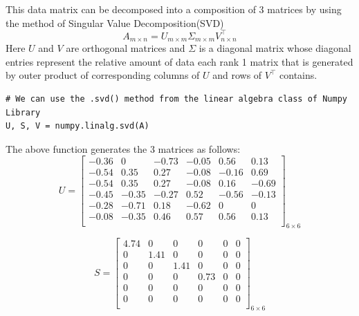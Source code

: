 \documentclass{article}
\begin{document}
This data matrix can be decomposed into a composition of 3 matrices by using the method of Singular Value Decomposition(SVD)
$$ A_{m \times n} = U_{m \times m} \Sigma_{m \times m} V^{\top}_{n \times n} $$
Here $U$ and $V$ are orthogonal matrices and $\Sigma$ is a diagonal matrix whose diagonal entries represent the relative amount of data each rank 1 matrix that is generated by outer product of corresponding columns of $U$ and rows of $V^{\top}$ contains. \\

\begin{verbatim}
# We can use the .svd() method from the linear algebra class of Numpy Library
U, S, V = numpy.linalg.svd(A)
\end{verbatim}

The above function generates the 3 matrices as follows:
\begin{equation*}
    U = \begin{bmatrix}
        -0.36 & 0 & -0.73 & -0.05 & 0.56 & 0.13 \\
        -0.54 & 0.35 & 0.27 & -0.08 & -0.16 & 0.69 \\
        -0.54 & 0.35 & 0.27 & -0.08 & 0.16 & -0.69 \\
        -0.45 & -0.35 & -0.27 & 0.52 & -0.56 & -0.13 \\
        -0.28 & -0.71 & 0.18 & -0.62 & 0 & 0 \\
        -0.08 & -0.35 & 0.46 & 0.57 & 0.56 & 0.13 \\
    \end{bmatrix}_{6\times6}
\end{equation*}

\begin{equation*}
    S = \begin{bmatrix}
        4.74 & 0 & 0 & 0 & 0 & 0 \\
        0 & 1.41 & 0 & 0 & 0 & 0 \\
        0 & 0 & 1.41 & 0 & 0 & 0 \\
        0 & 0 & 0 & 0.73 & 0 & 0 \\
        0 & 0 & 0 & 0 & 0 & 0 \\
        0 & 0 & 0 & 0 & 0 & 0 \\
    \end{bmatrix}_{6\times6}
\end{equation*}
\end{document}
